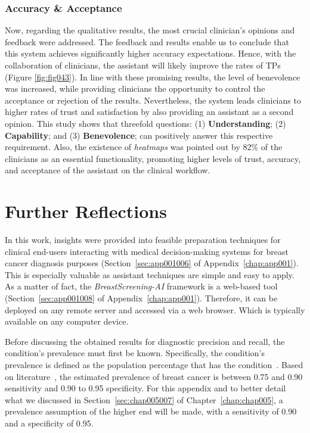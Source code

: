 \subsubsection{Accuracy \& Acceptance}
\label{sec:app003004009003}

Now, regarding the qualitative results, the most crucial clinician's opinions and feedback were addressed.
The feedback and results enable us to conclude that this system achieves significantly higher accuracy expectations.
Hence, with the collaboration of clinicians, the assistant will likely improve the rates of \acp{TP} (Figure \ref{fig:fig043}).
In line with these promising results, the level of benevolence was increased, while providing clinicians the opportunity to control the acceptance or rejection of the results.
Nevertheless, the system leads clinicians to higher rates of trust and satisfaction by also providing an assistant as a second opinion.
This study shows that threefold questions:
(1) {\bf Understanding};
(2) {\bf Capability}; and
(3) {\bf Benevolence};
can positively answer this respective requirement.
Also, the existence of {\it heatmaps} was pointed out by 82\% of the clinicians as an essential functionality, promoting higher levels of trust, accuracy, and acceptance of the assistant on the clinical workflow.

\section{Further Reflections}
\label{sec:app003005}

In this work, insights were provided into feasible preparation techniques for clinical end-users interacting with medical decision-making systems for breast cancer diagnosis purposes (Section~\ref{sec:app001006} of Appendix~\ref{chap:app001}).
This is especially valuable as assistant techniques are simple and easy to apply.
As a matter of fact, the {\it BreastScreening-AI} framework is a web-based tool (Section~\ref{sec:app001008} of Appendix~\ref{chap:app001}).
Therefore, it can be deployed on any remote server and accessed via a web browser.
Which is typically available on any computer device.

Before discussing the obtained results for diagnostic precision and recall, the condition's prevalence must first be known.
Specifically, the condition's prevalence is defined as the population percentage that has the condition~\cite{CALISTO2021102607}.
Based on literature~\cite{CALISTO2022102285}, the estimated prevalence of breast cancer is between 0.75 and 0.90 sensitivity and 0.90 to 0.95 specificity.
For this appendix and to better detail what we discussed in Section~\ref{sec:chap005007} of Chapter~\ref{chap:chap005}, a prevalence assumption of the higher end will be made, with a sensitivity of 0.90 and a specificity of 0.95.

